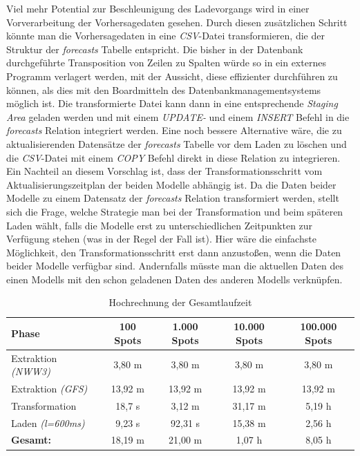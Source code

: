 Viel mehr Potential zur Beschleunigung des Ladevorgangs wird in einer
Vorverarbeitung der Vorhersagedaten gesehen. Durch diesen zusätzlichen
Schritt könnte man die Vorhersagedaten in eine \textit{CSV}-Datei
transformieren, die der Struktur der \textit{forecasts} Tabelle
entspricht. Die bisher in der Datenbank durchgeführte Transposition
von Zeilen zu Spalten würde so in ein externes Programm verlagert
werden, mit der Aussicht, diese effizienter durchführen zu können, als
dies mit den Boardmitteln des Datenbankmanagementsystems möglich
ist. Die transformierte Datei kann dann in eine entsprechende
\textit{Staging Area} geladen werden und mit einem \textit{UPDATE-}
und einem \textit{INSERT} Befehl in die \textit{forecasts} Relation
integriert werden. Eine noch bessere Alternative wäre, die zu
aktualisierenden Datensätze der \textit{forecasts} Tabelle vor dem
Laden zu löschen und die \textit{CSV}-Datei mit einem \textit{COPY}
Befehl direkt in diese Relation zu integrieren. Ein Nachteil an diesem
Vorschlag ist, dass der Transformationsschritt vom
Aktualisierungszeitplan der beiden Modelle abhängig ist. Da die Daten
beider Modelle zu einem Datensatz der \textit{forecasts} Relation
transformiert werden, stellt sich die Frage, welche Strategie man bei
der Transformation und beim späteren Laden wählt, falls die Modelle
erst zu unterschiedlichen Zeitpunkten zur Verfügung stehen (was in der
Regel der Fall ist). Hier wäre die einfachste Möglichkeit, den
Transformationsschritt erst dann anzustoßen, wenn die Daten beider
Modelle verfügbar sind. Andernfalls müsste man die aktuellen Daten des
einen Modells mit den schon geladenen Daten des anderen Modells
verknüpfen.

\begin{table}[h]
  \centering
  {\sf
    \footnotesize
    \begin{longtable}{l|c|c|c|c}

      \toprule
      \textbf{Phase} & \textbf{100 Spots} & \textbf{1.000 Spots} & \textbf{10.000 Spots} & \textbf{100.000 Spots}\\
      \midrule
      Extraktion \textit{(NWW3)} & 3,80 m & 3,80 m & 3,80 m & 3,80 m \\
      Extraktion \textit{(GFS)} & 13,92 m & 13,92 m & 13,92 m & 13,92 m \\
      \midrule
      Transformation & 18,7 s & 3,12 m & 31,17 m & 5,19 h \\
      Laden \textit{(l=600ms)} & 9,23 s & 92,31 s & 15,38 m & 2,56 h \\
      \bottomrule
      \textbf{Gesamt:} & 18,19 m & 21,00 m & 1,07 h & 8,05 h \\
      \bottomrule
    \end{longtable}
  }

  \caption{Hochrechnung der Gesamtlaufzeit}
  \label{tab:gesamt_laufzeit}

\end{table}

